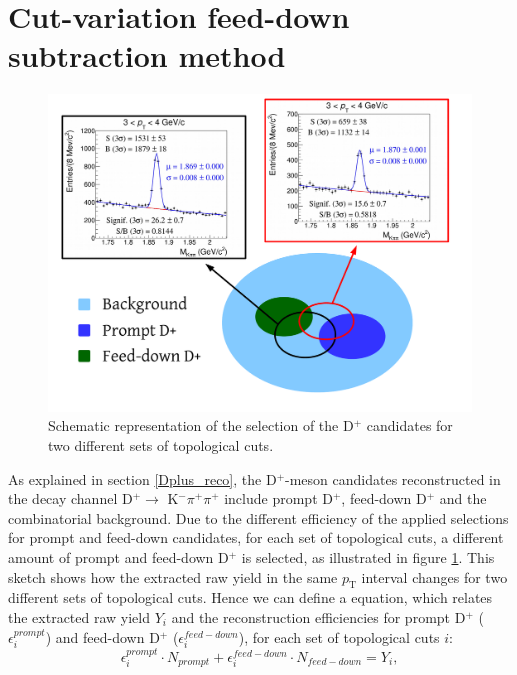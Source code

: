 \documentclass[b5paper,10pt,twoside,oldstyle,classica]{toptesi}
\newcommand{\pt}{p_\text{T}}
\begin{document}
\section{Cut-variation feed-down subtraction method}
\label{cutvar_methods}
\begin{figure}[tb]
\begin{center}
\includegraphics[scale = 0.4]{cutvar_sketch.pdf}
\caption{Schematic representation of the selection of the D$^+$ candidates for two different sets of topological cuts.}
\label{cutvar_sketch}
\end{center}
\end{figure}
As explained in section \ref{Dplus_reco}, the D$^+$-meson candidates reconstructed in the decay channel D$^+\rightarrow$ K$^-\pi^+\pi^+$ include prompt D$^+$, feed-down D$^+$ and the combinatorial background. Due to the different efficiency of the applied selections for prompt and feed-down candidates, for each set of topological cuts, a different amount of prompt and feed-down D$^+$ is selected, as illustrated in figure \ref{cutvar_sketch}. This sketch shows how the extracted raw yield in the same $\pt$ interval changes for two different sets of topological cuts. Hence we can define a equation, which relates the extracted raw yield $Y_i$ and the reconstruction efficiencies for prompt D$^+$ ($\epsilon^{prompt}_i$) and feed-down D$^+$ ($\epsilon^{feed-down}_{i}$), for each set of topological cuts $i$:
\begin{equation}
 \epsilon^{prompt}_i\cdot N_{prompt} + \epsilon^{feed-down}_i\cdot N_{feed-down} = Y_i,
\label{eq_set}
\end{equation}
\end{document}
